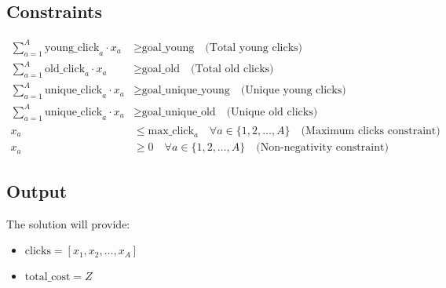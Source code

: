 \documentclass{article}
\begin{document}
\subsection*{Constraints}
\begin{align*}
\sum_{a=1}^{A} \text{young\_click}_a \cdot x_a & \geq \text{goal\_young} \quad \text{(Total young clicks)} \\
\sum_{a=1}^{A} \text{old\_click}_a \cdot x_a & \geq \text{goal\_old} \quad \text{(Total old clicks)} \\
\sum_{a=1}^{A} \text{unique\_click}_a \cdot x_a & \geq \text{goal\_unique\_young} \quad \text{(Unique young clicks)} \\
\sum_{a=1}^{A} \text{unique\_click}_a \cdot x_a & \geq \text{goal\_unique\_old} \quad \text{(Unique old clicks)} \\
x_a & \leq \text{max\_click}_a \quad \forall a \in \{1, 2, \ldots, A\} \quad \text{(Maximum clicks constraint)} \\
x_a & \geq 0 \quad \forall a \in \{1, 2, \ldots, A\} \quad \text{(Non-negativity constraint)}
\end{align*}

\subsection*{Output}
The solution will provide:
\begin{itemize}
    \item \( \text{clicks} = [x_1, x_2, \ldots, x_A] \)
    \item \( \text{total\_cost} = Z \)
\end{itemize}
\end{document}
